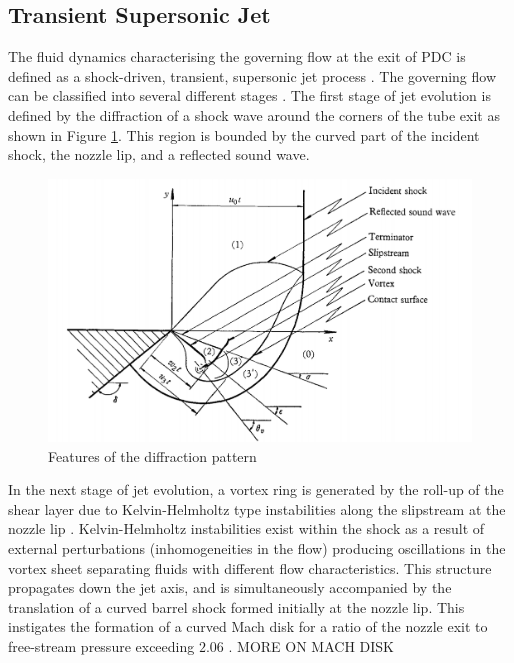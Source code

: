 \subsection{Transient Supersonic Jet}
The fluid dynamics characterising the governing flow at the exit of PDC is defined as a shock-driven, transient, supersonic jet process \cite{radulescu2007transient}. The governing flow can be classified into several different stages \cite{ishii1999experimental}. The first stage of jet evolution is defined by the diffraction of a shock wave around the corners of the tube exit as shown in Figure \ref{fig:0}. This region is bounded by the curved part of the incident shock, the nozzle lip, and a reflected sound wave. 
\begin{figure}[h]  
\centering
\includegraphics[scale=0.9]{fig0.PNG}
\caption{Features of the diffraction pattern \cite{skews1967perturbed}}
\label{fig:0}
\end{figure}
In the next stage of jet evolution, a vortex ring is generated by the roll-up of the shear layer due to Kelvin-Helmholtz type instabilities along the slipstream at the nozzle lip \cite{elder1952experimental,dora2014role}. Kelvin-Helmholtz instabilities exist within the shock as a result of external perturbations (inhomogeneities in the flow) producing oscillations in the vortex sheet separating fluids with different flow characteristics. This structure propagates down the jet axis, and is simultaneously accompanied by the translation of a curved barrel shock formed initially at the nozzle lip. This instigates the formation of a curved Mach disk for a ratio of the nozzle exit to free-stream pressure exceeding $2.06$ \cite{matsuda1987numerical}. MORE ON MACH DISK


